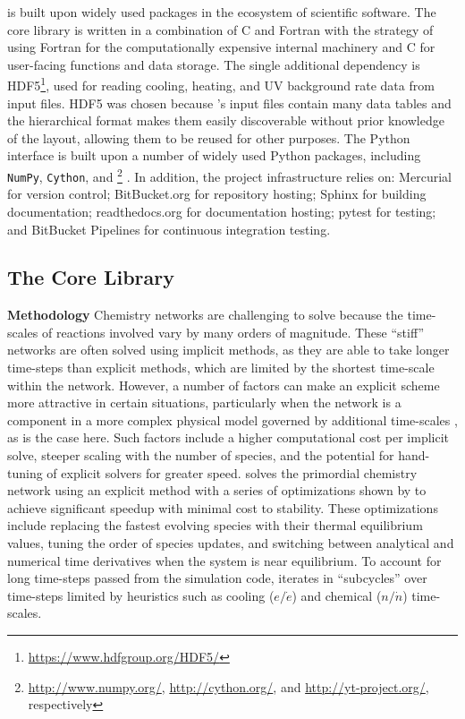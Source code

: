 \grackle{} is built upon widely used packages in the ecosystem of
scientific software.
The core
library is written in a combination of C and Fortran with the strategy
of using Fortran for the computationally expensive internal machinery
and C for user-facing functions and data storage.  The single
additional dependency is
HDF5\footnote{\url{https://www.hdfgroup.org/HDF5/}}, used for reading
cooling, heating,
and UV background rate data from input files.  HDF5 was chosen because
\grackle{}'s input files contain many data tables and the hierarchical
format makes them easily discoverable without prior knowledge of the
layout, allowing them to be reused for other purposes.  The Python
interface is built upon a number of widely used Python packages, including
\texttt{NumPy}, \texttt{Cython}, and
\yt{}\footnote{\url{http://www.numpy.org/}, \url{http://cython.org/},
  and \url{http://yt-project.org/}, respectively} \citep[][an SI2-funded
project]{2011ApJS..192....9T}.  In
addition, the project infrastructure relies on:
Mercurial for version control; BitBucket.org for repository hosting;
Sphinx for building documentation; readthedocs.org for documentation
hosting; pytest for testing; and BitBucket Pipelines for continuous
integration testing.

\subsection{The Core Library}
\label{sec:core-library}

\noindent
{\bf Methodology}
Chemistry networks are challenging to solve because the time-scales of
reactions involved vary by many orders of magnitude.  These ``stiff''
networks are often solved using implicit methods, as they are able to
take longer time-steps than explicit methods, which are limited by the
shortest time-scale within the network.  However, a number of factors
can make an explicit scheme more attractive in certain situations,
particularly when the network is a component in a more complex physical
model governed by additional time-scales \citep{2012JCoPh.231.5266G},
as is the case here.  Such factors include a higher
computational cost per implicit solve, steeper scaling
with the number of species, and the potential for hand-tuning of
explicit solvers for greater speed.  \grackle{} solves the primordial
chemistry network using an explicit method with a series of
optimizations shown by \citet{1997NewA....2..181A} to achieve
significant speedup with minimal cost to stability.  These
optimizations include replacing the fastest evolving species with
their thermal equilibrium values, tuning the order of species updates,
and switching between analytical and numerical time derivatives when
the system is near equilibrium. To account for long time-steps passed
from the simulation code, \grackle{} iterates in ``subcycles'' over
time-steps limited by heuristics such as cooling ($e/\dot{e}$) and chemical
($n/\dot{n}$) time-scales.

